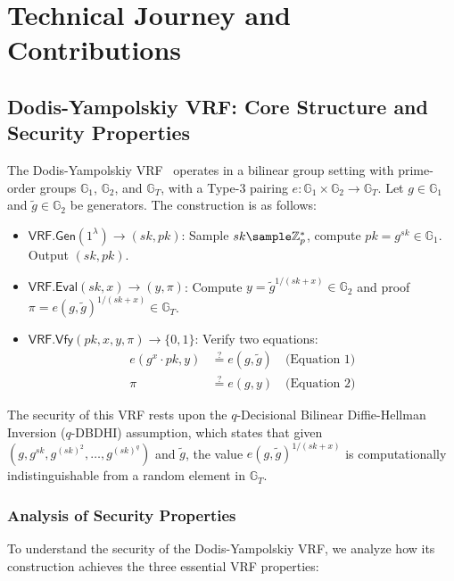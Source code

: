 \section{Technical Journey and Contributions}

\subsection{Dodis-Yampolskiy VRF: Core Structure and Security Properties}

The Dodis-Yampolskiy VRF~\cite{hutchison_verifiable_2005} operates in a bilinear group setting with prime-order groups $\mathbb{G}_1$, $\mathbb{G}_2$, and $\mathbb{G}_T$, with a Type-3 pairing $e: \mathbb{G}_1 \times \mathbb{G}_2 \rightarrow \mathbb{G}_T$. Let $g \in \mathbb{G}_1$ and $\tilde{g} \in \mathbb{G}_2$ be generators. The construction is as follows:

\begin{itemize}
    \item $\mathsf{VRF.Gen}(1^\lambda) \to (sk, pk)$: Sample $sk \sample \mathbb{Z}_p^*$, compute $pk = g^{sk} \in \mathbb{G}_1$. Output $(sk, pk)$.
    
    \item $\mathsf{VRF.Eval}(sk, x) \to (y, \pi)$: Compute $y = \tilde{g}^{1/(sk + x)} \in \mathbb{G}_2$ and proof $\pi = e(g, \tilde{g})^{1/(sk + x)} \in \mathbb{G}_T$.
    
    \item $\mathsf{VRF.Vfy}(pk, x, y, \pi) \to \{0, 1\}$: Verify two equations:
    \begin{align}
        e(g^{x} \cdot pk, y) &\stackrel{?}{=} e(g, \tilde{g}) \quad \text{(Equation 1)}\\
        \pi &\stackrel{?}{=} e(g, y) \quad \text{(Equation 2)}
    \end{align}
\end{itemize}

The security of this VRF rests upon the $q$-Decisional Bilinear Diffie-Hellman Inversion ($q$-DBDHI) assumption, which states that given $(g, g^{sk}, g^{(sk)^2}, \ldots, g^{(sk)^q})$ and $\tilde{g}$, the value $e(g, \tilde{g})^{1/(sk+x)}$ is computationally indistinguishable from a random element in $\mathbb{G}_T$.

\subsubsection{Analysis of Security Properties}

To understand the security of the Dodis-Yampolskiy VRF, we analyze how its construction achieves the three essential VRF properties:

